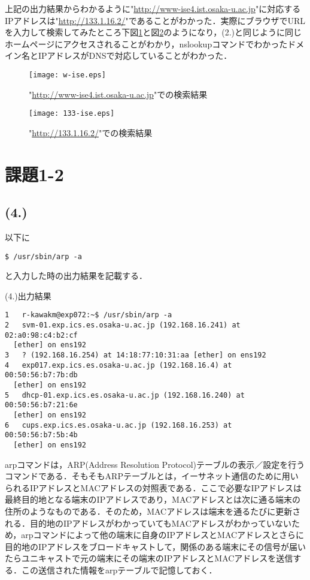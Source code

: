 \documentclass[a4j]{jarticle}
\newenvironment{bit}{\begin{breakitembox}}{\end{breakitembox}} %
\begin{document}
上記の出力結果からわかるように"\url{http://www-ise4.ist.osaka-u.ac.jp}"に対応するIPアドレスは"\url{http://133.1.16.2/}"であることがわかった．実際にブラウザでURLを入力して検索してみたところ下図\ref{fig:w-ise}と図\ref{fig:133-ise}のようになり，(2.)と同じように同じホームページにアクセスされることがわかり，nslookupコマンドでわかったドメイン名とIPアドレスがDNSで対応していることがわかった．

\begin{figure}[htb]
\centering
\texttt{[image: w-ise.eps]}
\caption{"\url{http://www-ise4.ist.osaka-u.ac.jp}"での検索結果}
\label{fig:w-ise}
\end{figure}

\begin{figure}[htb]
\centering
\texttt{[image: 133-ise.eps]}
\caption{"\url{http://133.1.16.2/}"での検索結果}
\label{fig:133-ise}
\end{figure}

\section{課題1-2}


\subsection{(4.)}
\label{1-1-4}

以下に
\begin{verbatim}
$ /usr/sbin/arp -a
\end{verbatim}
と入力した時の出力結果を記載する．

\begin{bit}[l]{(4.)出力結果}
\small{
\begin{verbatim}
1	r-kawakm@exp072:~$ /usr/sbin/arp -a
2	svm-01.exp.ics.es.osaka-u.ac.jp (192.168.16.241) at 02:a0:98:c4:b2:cf
  [ether] on ens192
3	? (192.168.16.254) at 14:18:77:10:31:aa [ether] on ens192
4	exp017.exp.ics.es.osaka-u.ac.jp (192.168.16.4) at 00:50:56:b7:7b:db
  [ether] on ens192
5	dhcp-01.exp.ics.es.osaka-u.ac.jp (192.168.16.240) at 00:50:56:b7:21:6e
  [ether] on ens192
6	cups.exp.ics.es.osaka-u.ac.jp (192.168.16.253) at 00:50:56:b7:5b:4b
  [ether] on ens192
\end{verbatim}
}
\end{bit}

arpコマンドは，ARP(Address Resolution Protocol)テーブルの表示／設定を行うコマンドである．そもそもARPテーブルとは，イーサネット通信のために用いられるIPアドレスとMACアドレスの対照表である．ここで必要なIPアドレスは最終目的地となる端末のIPアドレスであり，MACアドレスとは次に通る端末の住所のようなものである．そのため，MACアドレスは端末を通るたびに更新される．目的地のIPアドレスがわかっていてもMACアドレスがわかっていないため，arpコマンドによって他の端末に自身のIPアドレスとMACアドレスとさらに目的地のIPアドレスをブロードキャストして，関係のある端末にその信号が届いたらユニキャストで元の端末にその端末のIPアドレスとMACアドレスを送信する．この送信された情報をarpテーブルで記憶しておく．
\end{document}
